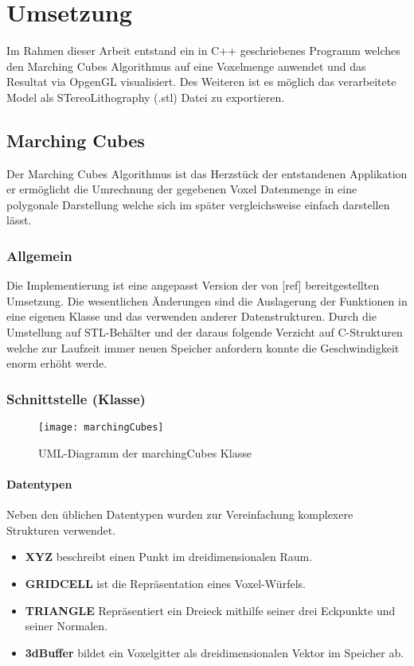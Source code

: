\chapter{Umsetzung}
Im Rahmen dieser Arbeit entstand ein in C++ geschriebenes Programm welches den Marching Cubes Algorithmus auf eine Voxelmenge anwendet und das Resultat via OpgenGL visualisiert. Des Weiteren ist es möglich das verarbeitete Model als STereoLithography (.stl) Datei zu exportieren.
\section{Marching Cubes}
\label{sec:mcUms}
Der Marching Cubes Algorithmus ist das Herzstück der entstandenen Applikation er ermöglicht die Umrechnung der gegebenen Voxel Datenmenge in eine polygonale Darstellung welche sich im später vergleichsweise einfach darstellen lässt.
\subsection{Allgemein}
Die Implementierung ist eine angepasst Version der von [ref] bereitgestellten Umsetzung. Die wesentlichen Änderungen sind die Auslagerung der Funktionen in eine eigenen Klasse und das verwenden anderer Datenstrukturen. Durch die Umstellung auf STL-Behälter und der daraus folgende Verzicht auf C-Strukturen welche zur Laufzeit immer neuen Speicher anfordern konnte die Geschwindigkeit enorm erhöht werde.
\subsection{Schnittstelle (Klasse)}
\begin{figure}[H]
	\centering
	\texttt{[image: marchingCubes]}
	\caption{UML-Diagramm der marchingCubes Klasse}
	\label{fig:marchingCubes}
\end{figure}

\subsubsection{Datentypen}
Neben den üblichen Datentypen wurden zur Vereinfachung komplexere Strukturen verwendet.\\
\begin{itemize}
	\item \textbf{XYZ} beschreibt einen Punkt im dreidimensionalen Raum.
	\item \textbf{GRIDCELL} ist die Repräsentation eines Voxel-Würfels. 
	\item \textbf{TRIANGLE} Repräsentiert ein Dreieck mithilfe seiner drei Eckpunkte und seiner Normalen.
	\item \textbf{3dBuffer} bildet ein Voxelgitter als dreidimensionalen Vektor im Speicher ab.
\end{itemize}

